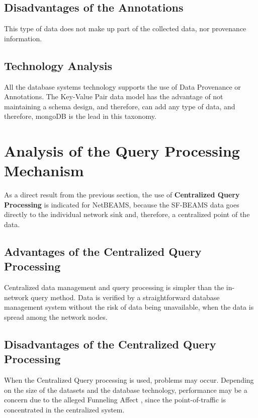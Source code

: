 \subsection{Disadvantages of the Annotations}

This type of data does not make up part of the collected data, nor provenance
information. 

\subsection{Technology Analysis}

All the database systems technology supports the use of Data Provenance or
Annotations. The Key-Value Pair data model has the advantage of not maintaining
a schema design, and therefore, can add any type of data, and therefore,
mongoDB is the lead in this taxonomy.

\section{Analysis of the Query Processing Mechanism}

As a direct result from the previous section, the use of \textbf{Centralized Query
Processing} is indicated for NetBEAMS, because the SF-BEAMS data goes directly
to the individual network sink and, therefore, a centralized point of the data.

\subsection{Advantages of the Centralized Query Processing}

Centralized data management and query processing is simpler than the in-network
query method. Data is verified by a straightforward database management system
without the risk of data being unavailable, when the data is spread among the
network nodes.

\subsection{Disadvantages of the Centralized Query Processing}

When the Centralized Query processing is used, problems may occur. Depending on
the size of the datasets and the database technology, performance may be a
concern due to the alleged Funneling Affect \cite{sn-storage04}, since the
point-of-traffic is concentrated in the centralized system.

